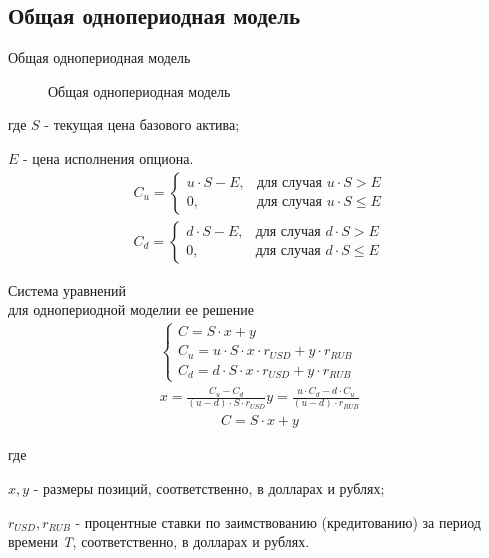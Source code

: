 \documentclass[_fin_decisions_lectures.tex]{subfiles}
\begin{document}
\subsection{Общая однопериодная модель}
\begin{frame}{Общая однопериодная модель}
\begin{figure}
	\center
	\begin{overprint}
	\end{overprint}
	\caption{Общая однопериодная модель}
\end{figure}
\end{frame}
\begin{frame}
где
$S$ - текущая цена базового актива;

$E$ - цена исполнения опциона.
\begin{align}
C_u = \begin{cases} u \cdot S - E, & \mbox{для случая } u \cdot S > E \\ 
0, & \mbox{для случая } u \cdot S \leq E \end{cases}\\
C_d = \begin{cases} d \cdot S - E, & \mbox{для случая } d \cdot S > E \\ 
0, & \mbox{для случая } d \cdot S \leq E \end{cases}
\end{align}
\end{frame}
\begin{frame}[shrink=15]{Система уравнений\\для однопериодной модели}{и ее решение}
\begin{align}
\begin{cases} 
C = S \cdot x + y\\ 
C_u = u \cdot S \cdot x \cdot r_{USD} + y \cdot r_{RUB}\\
C_d = d \cdot S \cdot x \cdot r_{USD} + y \cdot r_{RUB}
\end{cases}\\[12pt]
x=\frac{C_u-C_d}{(u-d)\cdot S \cdot r_{USD}}
y=\frac{u \cdot C_d-d \cdot C_u}{(u-d) \cdot r_{RUB}}
\end{align}
\begin{align}
C = S \cdot x + y
\end{align}

где

$x, y$ - размеры позиций, соответственно, в долларах и рублях;

$r_{USD},r_{RUB}$ - процентные ставки по заимствованию (кредитованию) за период времени \textit{T}, соответственно, в долларах и рублях.
\end{frame}
\end{document}
